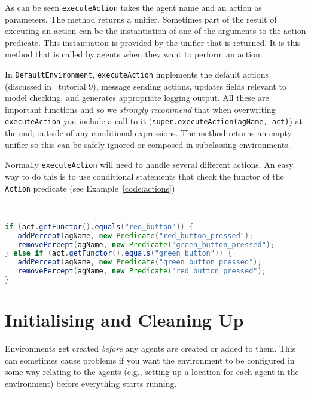 As can be seen \texttt{executeAction} takes the agent name and an action as parameters.  The method returns a unifier.  Sometimes part of the result of executing an action can be the instantiation of one of the arguments to the action predicate.  This instantiation is provided by the unifier that is returned.  It is this method that is called by agents when they want to perform an action.

In \texttt{DefaultEnvironment}, \texttt{executeAction} implements the default actions (discussed in \gwendolen\ tutorial 9), message sending actions, updates fields relevant to model checking, and generates appropriate logging output.   All these are important functions and so we \emph{strongly recommend} that when overwriting \texttt{executeAction} you include a call to it (\texttt{super.executeAction(agName, act)}) at the end, outside of any conditional expressions.  The method returns an empty unifier so this can be safely ignored or composed in subclassing environments.

Normally \texttt{executeAction} will need to handle several different actions.  An easy way to do this is to use conditional statements that check the functor of the \texttt{Action} predicate (see Example~\ref{code:actions})

\begin{ourexample}
\label{code:actions} \quad \\
\begin{lstlisting}[basicstyle=\sffamily,language=Java,style=easslisting]
if (act.getFunctor().equals("red_button")) {
   addPercept(agName, new Predicate("red_button_pressed");
   removePercept(agName, new Predicate("green_button_pressed");
} else if (act.getFunctor().equals("green_button")) {
   addPercept(agName, new Predicate("green_button_pressed");
   removePercept(agName, new Predicate("red_button_pressed");
}
\end{lstlisting}
\end{ourexample}

\section{Initialising and Cleaning Up}
Environments get created \emph{before} any agents are created or added to them.  This can sometimes cause problems if you want the environment to be configured in some way relating to the agents (e.g., setting up a location for each agent in the environment) before everything starts running.

